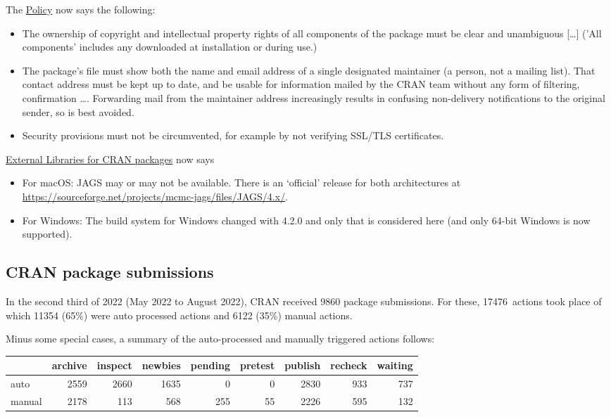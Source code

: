 The
\href{https://CRAN.R-project.org/web/packages/policies.html}{Policy}
now says the following:
\begin{itemize}
 \item The ownership of copyright and intellectual property rights of
  all components of the package must be clear and unambiguous [\ldots]
  ('All components' includes any downloaded at installation or during
  use.)
 \item The package’s  file must show both the name and
  email address of a single designated maintainer (a person, not a
  mailing list).  That contact address must be kept up to date, and be
  usable for information mailed by the CRAN team without any form of
  filtering, confirmation \ldots. Forwarding mail from the maintainer
  address increasingly results in confusing non-delivery notifications
  to the original sender, so is best avoided.
 \item Security provisions must not be circumvented, for example by not
  verifying SSL/TLS certificates.
\end{itemize}

\href{https://CRAN.R-project.org/web/packages/external_libs.html}{External
  Libraries for CRAN packages} now says
\begin{itemize}
 \item For macOS: JAGS may or may not be available.  There is an
  `official' release for both architectures at
  \url{https://sourceforge.net/projects/mcmc-jags/files/JAGS/4.x/}.
 \item For Windows: The build system for Windows changed with 4.2.0 and
  only that is considered here (and only 64-bit Windows is now
  supported).  
\end{itemize}

\subsection{CRAN package submissions}

In the second third of 2022 (May 2022 to August 2022), CRAN received 
9860 package submissions.
For these,  17476~actions took place of which 11354 (65\%) were auto
processed actions and 6122 (35\%) manual actions.

Minus some special cases, a summary of the auto-processed and manually
triggered actions follows:
\begin{center}
  \setlength{\tabcolsep}{2pt}
\begin{tabular}{l|rrrrrrrr}
           &archive& inspect& newbies& pending& pretest& publish& 
recheck& waiting\\ \hline
   auto    &  2559 &   2660 &   1635 &      0 &      0 &   2830 &    933 
&    737\\
   manual  &  2178 &    113 &    568 &    255 &     55 &   2226 &    595 
&    132
\end{tabular}
\end{center}

